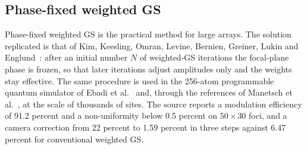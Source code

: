 
\subsection{Phase-fixed weighted GS}\label{sec:m07}

Phase-fixed weighted GS is the practical method for large arrays. The solution replicated is that of Kim, Keesling, Omran, Levine, Bernien, Greiner, Lukin and Englund~\cite{kim2019}: after an initial number $N$ of weighted-GS iterations the focal-plane phase is frozen, so that later iterations adjust amplitudes only and the weights stay effective. The same procedure is used in the 256-atom programmable quantum simulator of Ebadi et al.~\cite{ebadi2021} and, through the references of Manetsch et al.~\cite{manetsch}, at the scale of thousands of sites. The source reports a modulation efficiency of 91.2 percent and a non-uniformity below 0.5 percent on $50\times30$ foci, and a camera correction from 22 percent to 1.59 percent in three steps against 6.47 percent for conventional weighted GS.

